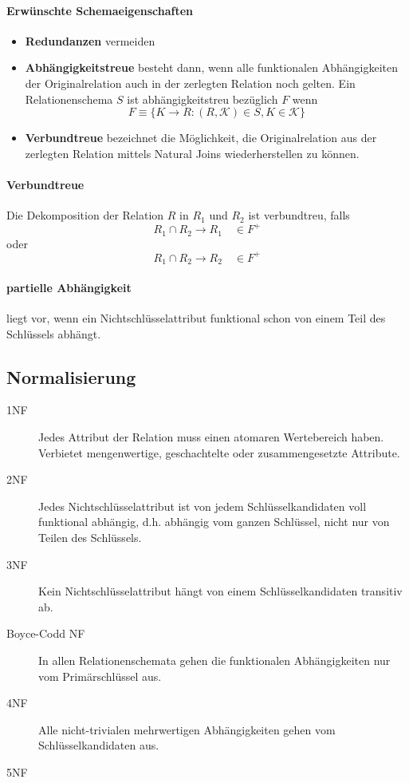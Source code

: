 \documentclass[]{scrartcl}
\begin{document}
\paragraph{Erw\"unschte Schemaeigenschaften}
\begin{itemize}
\item \textbf{Redundanzen} vermeiden
\item \textbf{Abh\"angigkeitstreue} besteht dann, wenn alle funktionalen Abh\"angigkeiten der Originalrelation auch in der zerlegten Relation noch gelten. Ein Relationenschema $S$ ist abh\"angigkeitstreu bez\"uglich $F$ wenn 
$$F \equiv \{ K \to R : (R, \mathcal{K}) \in S, K \in \mathcal{K} \} $$
\item \textbf{Verbundtreue} bezeichnet die M\"oglichkeit, die Originalrelation aus der zerlegten Relation mittels Natural Joins wiederherstellen zu k\"onnen. 
\end{itemize}



\paragraph{Verbundtreue}
Die Dekomposition der Relation $R$ in $R_{1}$ und $R_{2}$ ist verbundtreu, falls
$$R_{1} \cap R_{2} \to R_{1} \quad \in F^+$$ oder
$$R_{1} \cap R_{2} \to R_{2} \quad \in F^+$$

\paragraph{partielle Abh\"angigkeit} liegt vor, wenn ein Nichtschl\"usselattribut funktional schon von einem Teil des Schl\"ussels abh\"angt.

\subsection{Normalisierung}

\begin{description}
\item[1NF] Jedes Attribut der Relation muss einen atomaren Wertebereich haben. Verbietet mengenwertige, geschachtelte oder zusammengesetzte Attribute.
\item[2NF] Jedes Nichtschl\"usselattribut ist von jedem Schl\"usselkandidaten voll funktional abh\"angig, d.h. abh\"angig vom ganzen Schl\"ussel, nicht nur von Teilen des Schl\"ussels.
\item[3NF] Kein Nichtschl\"usselattribut h\"angt von einem Schl\"usselkandidaten transitiv ab.
\item[Boyce-Codd NF] In allen Relationenschemata gehen die funktionalen Abh\"angigkeiten nur vom Prim\"arschl\"ussel aus.
\item[4NF] Alle nicht-trivialen mehrwertigen Abh\"angigkeiten gehen vom Schl\"usselkandidaten aus.
\item[5NF]
\end{description}
\end{document}
